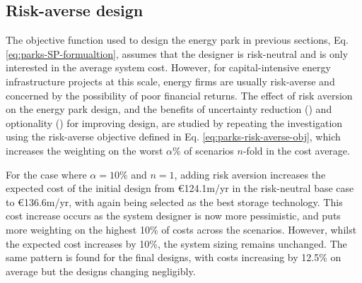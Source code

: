 \newpage
\subsection{Risk-averse design}



The objective function used to design the energy park in previous sections, Eq. \ref{eq:parks-SP-formualtion}, assumes that the designer is risk-neutral and is only interested in the average system cost. However, for capital-intensive energy infrastructure projects at this scale, energy firms are usually risk-averse and concerned by the possibility of poor financial returns. The effect of risk aversion on the energy park design, and the benefits of uncertainty reduction () and optionality () for improving design, are studied by repeating the investigation using the risk-averse objective defined in Eq. \ref{eq:parks-risk-averse-obj}, which increases the weighting on the worst $\alpha\%$ of scenarios $n$-fold in the cost average.

For the case where $\alpha=10\%$ and $n=1$, adding risk aversion increases the expected cost of the initial design from \euro124.1m/yr in the risk-neutral base case to \euro136.6m/yr, with  again being selected as the best storage technology. This cost increase occurs as the system designer is now more pessimistic, and puts more weighting on the highest 10\% of costs across the scenarios. However, whilst the expected cost increases by 10\%, the system sizing remains unchanged. The same pattern is found for the final designs, with costs increasing by 12.5\% on average but the designs changing negligibly.

